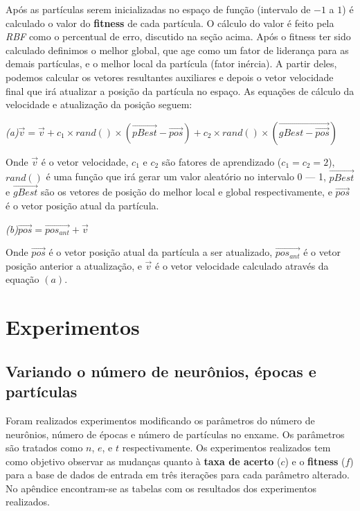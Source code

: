 \documentclass[10pt,twocolumn,letterpaper]{article}
\begin{document}
Após as partículas serem inicializadas no espaço de função (intervalo de $-1$ a $1$) é calculado o valor do \textbf{fitness} de cada partícula. O cálculo do valor é feito pela \textit{RBF} como o percentual de erro, discutido na seção acima.
Após o fitness ter sido calculado definimos o melhor global, que age como um fator de liderança para as demais partículas, e o melhor local da partícula (fator inércia). A partir deles, podemos calcular os vetores resultantes auxiliares e depois o vetor velocidade final que irá atualizar a posição da partícula no espaço. As equações de cálculo da velocidade e atualização da posição seguem:

\begin{center}
\textit{(a)}\qquad$\vec{v} = \vec{v} + c_1 \times rand() \times (\vec{pBest} - \vec{pos}) + c_2 \times rand() \times (\vec{gBest - \vec{pos}})$ 
\end{center}

Onde $\vec{v}$ é o vetor velocidade, $c_1$ e $c_2$ são fatores de aprendizado ($c_1 = c_2 = 2$), $rand()$ é uma função que irá gerar um valor aleatório no intervalo 0 --- 1, $\vec{pBest}$ e $\vec{gBest}$ são os vetores de posição do melhor local e global respectivamente, e $\vec{pos}$ é o vetor posição atual da partícula. 

\begin{center}
\textit{(b)}\qquad$\vec{pos} = \vec{pos_{ant}} + \vec{v}$ 
\end{center}
Onde $\vec{pos}$ é o vetor posição atual da partícula a ser atualizado, $\vec{pos_{ant}}$ é o vetor posição anterior a atualização, e $\vec{v}$ é o vetor velocidade calculado através da equação $(a)$.

\section{Experimentos}

\subsection{Variando o número de neurônios, épocas e partículas}
Foram realizados experimentos modificando os parâmetros do número de neurônios, número de épocas e número de partículas no enxame. Os parâmetros são tratados como $n$, $e$, e $t$ respectivamente. Os experimentos realizados tem como objetivo observar as mudanças quanto à \textbf{taxa de acerto} ($c$) e o \textbf{fitness} ($f$) para a base de dados de entrada em três iterações para cada parâmetro alterado. No apêndice encontram-se as tabelas com os resultados dos experimentos realizados.
\end{document}
